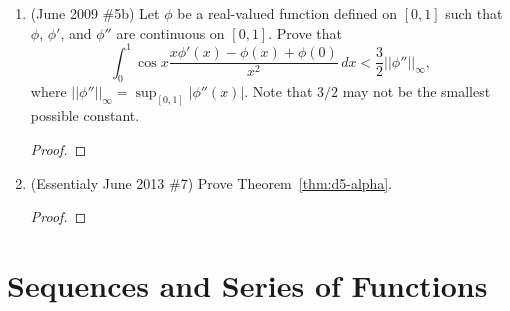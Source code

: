 \documentclass[reqno]{article}
\theoremstyle{remark}
\numberwithin{equation}{section}
\begin{document}
\begin{enumerate}
\begin{proof}
    By the Fundamental Theorem of Calculus we know that 
    
    $$\int_0^1x^4dx=\frac{1}{5}.$$
    
    Thus, it follows that 

$$\frac{1}{5}f(a)\leq\int_0^1 x^4f(x)dx\leq \frac{1}{5}f(b)$$
giving 

$$f(a)\leq 5\int_0^1 x^4f(x)dx\leq f(b).$$

By the Intermediate Value Theorem, there exists $\xi\in[0,1]$ such that 

$$f(\xi)=5\int_0^1 x^4f(x)dx.$$

Therefore, we have that there exists $\xi\in[0,1]$ such that $\int_0^1 x^4 f(x)dx=\frac{1}{5}f(\xi)$. 
   
    
    
    \end{proof}
	
	\item (June 2009 \#5b) Let $\phi$ be a real-valued function defined on $[0,1]$ such that $\phi$, $\phi'$, and $\phi''$ are continuous on $[0,1]$. Prove that $$\int_0^1 \cos x \frac{x\phi'(x)-\phi(x)+\phi(0)}{x^2}\,dx<\frac{3}{2}||\phi''||_\infty,$$
	where $||\phi''||_\infty = \sup_{[0,1]}|\phi''(x)|.$ Note that $3/2$ may not be the smallest possible constant.
	
	\begin{proof}
    
    \end{proof}
	
	\item (Essentialy June 2013 \#7) Prove Theorem~\ref{thm:d5-alpha}.
	
	\begin{proof}
    
    \end{proof}

\end{enumerate} 


\section{Sequences and Series of Functions} 
\end{document}
